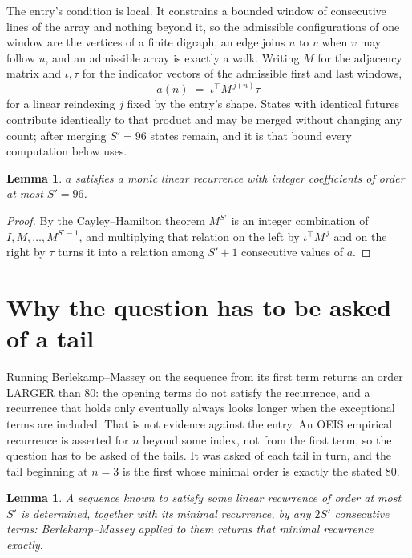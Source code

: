 \documentclass[11pt,a4paper]{article}
\theoremstyle{plain}
\newtheorem{lemma}[theorem]{Lemma}
\theoremstyle{definition}
\begin{document}
The entry's condition is local. It constrains a bounded window of consecutive lines of the
array and nothing beyond it, so the admissible configurations of one window are the vertices of
a finite digraph, an edge joins $u$ to $v$ when $v$ may follow $u$, and an admissible array is
exactly a walk. Writing $M$ for the adjacency matrix and $\iota,\tau$ for the indicator vectors
of the admissible first and last windows,
\[
a(n)\;=\;\iota^{\!\top}M^{\,j(n)}\tau
\]
for a linear reindexing $j$ fixed by the entry's shape. States with identical futures
contribute identically to that product and may be merged without changing any count; after
merging $S'=96$ states remain, and it is that bound every computation below uses.

\begin{lemma}\label{lem:cf}
$a$ satisfies a monic linear recurrence with integer coefficients of order at most $S'=96$.
\end{lemma}

\begin{proof}
By the Cayley--Hamilton theorem $M^{S'}$ is an integer combination of $I,M,\dots,M^{S'-1}$,
and multiplying that relation on the left by $\iota^{\!\top}M^{\,j}$ and on the right by
$\tau$ turns it into a relation among $S'+1$ consecutive values of $a$.
\end{proof}

\section{Why the question has to be asked of a tail}

Running Berlekamp--Massey on the sequence from its first term returns an order LARGER than $80$: the opening terms do not satisfy the recurrence, and a recurrence that holds only eventually always looks longer when the exceptional terms are included. That is not evidence against the entry. An OEIS empirical recurrence is asserted for $n$ beyond some index, not from the first term, so the question has to be asked of the tails. It was asked of each tail in turn, and the tail beginning at $n=3$ is the first whose minimal order is exactly the stated $80$.

\begin{lemma}\label{lem:bm}
A sequence known to satisfy some linear recurrence of order at most $S'$ is determined,
together with its minimal recurrence, by any $2S'$ consecutive terms: Berlekamp--Massey applied
to them returns that minimal recurrence exactly.
\end{lemma}
\end{document}

